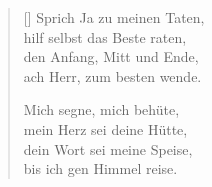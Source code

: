 \begin{multicols}{2}
\begin{verse}[\versewidth]
 Sprich Ja zu meinen Taten,\\
hilf selbst das Beste raten,\\
den Anfang, Mitt und Ende,\\
ach Herr, zum besten wende.

 Mich segne, mich behüte,\\
mein Herz sei deine Hütte,\\
dein Wort sei meine Speise,\\
bis ich gen Himmel reise.

\end{verse}
\end{multicols}
